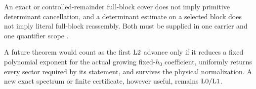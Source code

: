 \begin{proposition}
An exact or controlled-remainder full-block cover does not imply
primitive determinant cancellation, and a determinant estimate on a
selected block does not imply literal full-block reassembly.  Both
must be supplied in one carrier and one quantifier scope
\cite{WangTPC91,WangTPC92}.
\end{proposition}

\begin{remark}
A future theorem would count as the first \(\mathrm{L2}\) advance only if it
reduces a fixed polynomial exponent for the actual growing
fixed-\(h_0\) coefficient, uniformly returns every sector required by
its statement, and survives the physical normalization.  A new exact
spectrum or finite certificate, however useful, remains
\(\mathrm{L0}/\mathrm{L1}\).
\end{remark}
